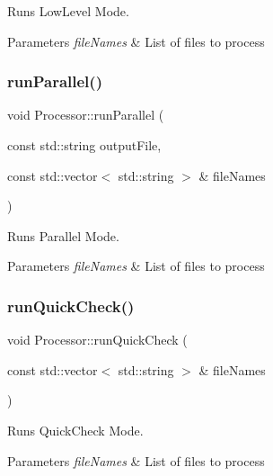 Runs Low\+Level Mode. 


\begin{DoxyParams}{Parameters}
{\em file\+Names} & List of files to process \\
\hline
\end{DoxyParams}
\mbox{\label{class_processor_ac95806facc4b5cbeb8a1b6df0cc9e431}} 
\subsubsection{\texorpdfstring{run\+Parallel()}{runParallel()}}
{\footnotesize\ttfamily void Processor\+::run\+Parallel (\begin{DoxyParamCaption}\item[{const std\+::string}]{output\+File,  }\item[{const std\+::vector$<$ std\+::string $>$ \&}]{file\+Names }\end{DoxyParamCaption})\hspace{0.3cm}{\ttfamily [private]}}



Runs Parallel Mode. 


\begin{DoxyParams}{Parameters}
{\em file\+Names} & List of files to process \\
\hline
\end{DoxyParams}
\mbox{\label{class_processor_ae045ebe853cd1f2124ecb93b829a9113}} 
\subsubsection{\texorpdfstring{run\+Quick\+Check()}{runQuickCheck()}}
{\footnotesize\ttfamily void Processor\+::run\+Quick\+Check (\begin{DoxyParamCaption}\item[{const std\+::vector$<$ std\+::string $>$ \&}]{file\+Names }\end{DoxyParamCaption})\hspace{0.3cm}{\ttfamily [private]}}



Runs Quick\+Check Mode. 


\begin{DoxyParams}{Parameters}
{\em file\+Names} & List of files to process \\
\hline
\end{DoxyParams}
\mbox{\label{class_processor_a0f2fc9c7e8c9271f7a9b171814ad094f}} 
